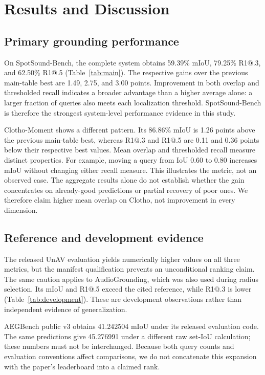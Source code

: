 \section{Results and Discussion}
\label{sec:discussion}
\subsection{Primary grounding performance}
On SpotSound-Bench, the complete system obtains 59.39\% mIoU, 79.25\% R1@.3, and 62.50\% R1@.5 (Table~\ref{tab:main}). The respective gains over the previous main-table best are 1.49, 2.75, and 3.00 points. Improvement in both overlap and thresholded recall indicates a broader advantage than a higher average alone: a larger fraction of queries also meets each localization threshold. SpotSound-Bench is therefore the strongest system-level performance evidence in this study.

Clotho-Moment shows a different pattern. Its 86.86\% mIoU is 1.26 points above the previous main-table best, whereas R1@.3 and R1@.5 are 0.11 and 0.36 points below their respective best values. Mean overlap and thresholded recall measure distinct properties. For example, moving a query from IoU 0.60 to 0.80 increases mIoU without changing either recall measure. This illustrates the metric, not an observed case. The aggregate results alone do not establish whether the gain concentrates on already-good predictions or partial recovery of poor ones. We therefore claim higher mean overlap on Clotho, not improvement in every dimension.

\subsection{Reference and development evidence}
The released UnAV evaluation yields numerically higher values on all three metrics, but the manifest qualification prevents an unconditional ranking claim. The same caution applies to AudioGrounding, which was also used during radius selection. Its mIoU and R1@.5 exceed the cited reference, while R1@.3 is lower (Table~\ref{tab:development}). These are development observations rather than independent evidence of generalization.

AEGBench public v3 obtains 41.242504 mIoU under its released evaluation code. The same predictions give 45.276991 under a different raw set-IoU calculation; these numbers must not be interchanged. Because both query counts and evaluation conventions affect comparisons, we do not concatenate this expansion with the paper's leaderboard into a claimed rank.



